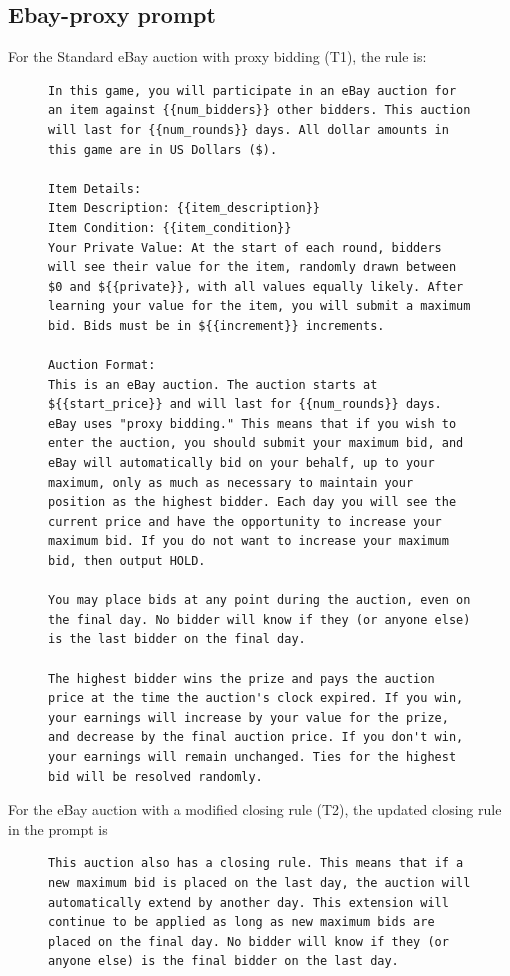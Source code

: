 \subsection{Ebay-proxy prompt}
For the Standard eBay auction with proxy bidding (T1), the rule is:
\begin{figure}[H]
\centering
\begin{minipage}{0.95\textwidth}
\begin{lstlisting}
In this game, you will participate in an eBay auction for an item against {{num_bidders}} other bidders. This auction will last for {{num_rounds}} days. All dollar amounts in this game are in US Dollars ($).

Item Details:
Item Description: {{item_description}}
Item Condition: {{item_condition}}
Your Private Value: At the start of each round, bidders will see their value for the item, randomly drawn between $0 and ${{private}}, with all values equally likely. After learning your value for the item, you will submit a maximum bid. Bids must be in ${{increment}} increments.

Auction Format:
This is an eBay auction. The auction starts at ${{start_price}} and will last for {{num_rounds}} days. eBay uses "proxy bidding." This means that if you wish to enter the auction, you should submit your maximum bid, and eBay will automatically bid on your behalf, up to your maximum, only as much as necessary to maintain your position as the highest bidder. Each day you will see the current price and have the opportunity to increase your maximum bid. If you do not want to increase your maximum bid, then output HOLD.

You may place bids at any point during the auction, even on the final day. No bidder will know if they (or anyone else) is the last bidder on the final day.

The highest bidder wins the prize and pays the auction price at the time the auction's clock expired. If you win, your earnings will increase by your value for the prize, and decrease by the final auction price. If you don't win, your earnings will remain unchanged. Ties for the highest bid will be resolved randomly.
\end{lstlisting}
\end{minipage}
\label{fig:sealbid_prompt}
\end{figure}


For the eBay auction with a modified closing rule (T2), the updated closing rule in the prompt is

\begin{figure}[H]
\centering
\begin{minipage}{0.95\textwidth}
\begin{lstlisting}
This auction also has a closing rule. This means that if a new maximum bid is placed on the last day, the auction will automatically extend by another day. This extension will continue to be applied as long as new maximum bids are placed on the final day. No bidder will know if they (or anyone else) is the final bidder on the last day.
\end{lstlisting}
\end{minipage}
\label{fig:sealbid_prompt}
\end{figure}


